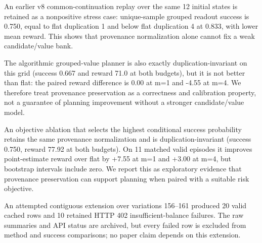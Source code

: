 \documentclass[10pt]{article}
\begin{document}
An earlier v8 common-continuation replay over the same 12 initial states is retained as a nonpositive stress case: unique-sample grouped readout success is 0.750, equal to flat duplication 1 and below flat duplication 4 at 0.833, with lower mean reward. This shows that provenance normalization alone cannot fix a weak candidate/value bank.

The algorithmic grouped-value planner is also exactly duplication-invariant on this grid (success 0.667 and reward 71.0 at both budgets), but it is not better than flat: the paired reward difference is 0.00 at m=1 and -4.55 at m=4. We therefore treat provenance preservation as a correctness and calibration property, not a guarantee of planning improvement without a stronger candidate/value model.

An objective ablation that selects the highest conditional success probability retains the same provenance normalization and is duplication-invariant (success 0.750, reward 77.92 at both budgets). On 11 matched valid episodes it improves point-estimate reward over flat by +7.55 at m=1 and +3.00 at m=4, but bootstrap intervals include zero. We report this as exploratory evidence that provenance preservation can support planning when paired with a suitable risk objective.

An attempted contiguous extension over variations 156--161 produced 20 valid cached rows and 10 retained HTTP 402 insufficient-balance failures. The raw summaries and API status are archived, but every failed row is excluded from method and success comparisons; no paper claim depends on this extension.
\end{document}
